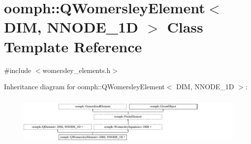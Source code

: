 \hypertarget{classoomph_1_1QWomersleyElement}{}\section{oomph\+:\+:Q\+Womersley\+Element$<$ D\+IM, N\+N\+O\+D\+E\+\_\+1D $>$ Class Template Reference}
\label{classoomph_1_1QWomersleyElement}


{\ttfamily \#include $<$womersley\+\_\+elements.\+h$>$}

Inheritance diagram for oomph\+:\+:Q\+Womersley\+Element$<$ D\+IM, N\+N\+O\+D\+E\+\_\+1D $>$\+:\begin{figure}[H]
\begin{center}
\leavevmode
\includegraphics[height=2.464246cm]{classoomph_1_1QWomersleyElement}
\end{center}
\end{figure}
